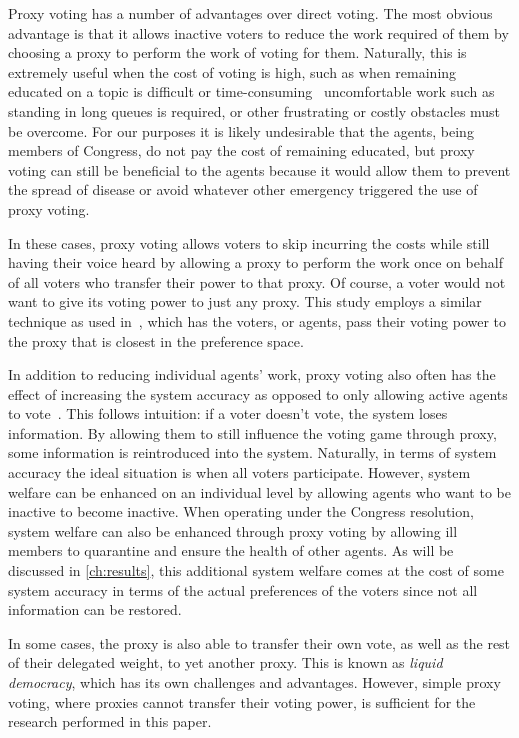 Proxy voting has a number of advantages over direct voting.
The most obvious advantage is that it allows inactive voters to reduce the work
required of them by choosing a proxy to perform the work of voting for them.
Naturally, this is extremely useful when the cost of voting is high, such as
when remaining educated on a topic is difficult or
time-consuming~\cite{Mueller1972} uncomfortable work such as standing in
long queues is required, or other frustrating or costly obstacles must be overcome.
For our purposes it is likely undesirable that the agents, being members of Congress,
do not pay the cost of remaining educated, but proxy voting can still be beneficial
to the agents because it would allow them to prevent the spread of disease or avoid
whatever other emergency triggered the use of proxy voting.

In these cases, proxy voting allows voters to skip incurring the costs while
still having their voice heard by allowing a proxy to perform the work once on
behalf of all voters who transfer their power to that proxy.
Of course, a voter would not want to give its voting power to just any proxy.
This study employs a similar technique as used in~\cite{Cohensius2017}, which has the
voters, or agents, pass their voting power to the proxy that is closest in the
preference space.

In addition to reducing individual agents' work, proxy voting also often has
the effect of increasing the system accuracy as opposed to only allowing active
agents to vote~\cite{Cohensius2017}.
This follows intuition: if a voter doesn't vote, the system loses information.
By allowing them to still influence the voting game through proxy, some information
is reintroduced into the system.
Naturally, in terms of system accuracy the ideal situation is when all voters
participate.
However, system welfare can be enhanced on an individual level by allowing agents
who want to be inactive to become inactive.
When operating under the Congress resolution, system welfare can also be enhanced
through proxy voting by allowing ill members to quarantine and ensure the health
of other agents.
As will be discussed in \autoref{ch:results}, this additional system welfare comes at
the cost of some system accuracy in terms of the actual preferences of the voters
since not all information can be restored.

In some cases, the proxy is also able to transfer their own vote, as well as the rest of
their delegated weight, to yet another proxy.
This is known as \textit{liquid democracy}, which has its own challenges and
advantages.
However, simple proxy voting, where proxies cannot transfer their voting power,
is sufficient for the research performed in this paper.

